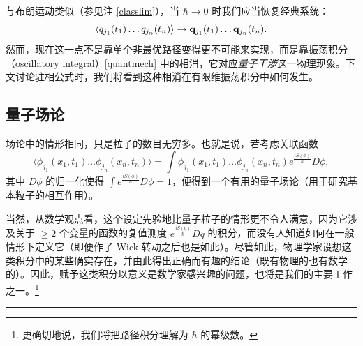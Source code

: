 \begin{remark} 与布朗运动类似（参见注 \ref{classlim}），当 $\hbar\to 0$ 时我们应当恢复经典系统：
$$
\langle q_{j_1}(t_1) \ldots q_{j_n}(t_n)\rangle\to \bold q_{j_1}(t_1) \ldots \bold q_{j_n}(t_n). 
$$
然而，现在这一点不是靠单个非最优路径变得更不可能来实现，而是靠振荡积分（oscillatory integral）\eqref{quantmech} 中的相消，它对应\emph{量子干涉}这一物理现象。下文讨论驻相公式时，我们将看到这种相消在有限维振荡积分中如何发生。
\end{remark}

\subsection{量子场论}

场论中的情形相同，只是粒子的数目无穷多。也就是说，若考虑关联函数
\begin{equation}\label{quanft}
\langle\phi_{j_1}(x_1,t_1) \ldots \phi_{j_n}(x_n,t_n)\rangle= 
\int \phi_{j_1}(x_1,t_1) \ldots \phi_{j_n}(x_n,t_n)e^{\frac{iS(\phi)}{\hbar}}D\phi, 
\end{equation}
其中 $D\phi$ 的归一化使得 $\int e^{\frac{iS(\phi)}{\hbar}}D\phi=1$，便得到一个有用的量子场论（用于研究基本粒子的相互作用）。

当然，从数学观点看，这个设定先验地比量子粒子的情形更不令人满意，因为它涉及关于 $\ge 2$ 个变量的函数的复值测度 $e^{\frac{iS(q)}{\hbar}}Dq$ 的积分，而没有人知道如何在一般情形下定义它（即便作了 Wick 转动之后也是如此）。尽管如此，物理学家设想这类积分中的某些确实存在，并由此得出正确而有趣的结论（既有物理的也有数学的）。因此，赋予这类积分以意义是数学家感兴趣的问题，也将是我们的主要工作之一。\footnote{更确切地说，我们将把路径积分理解为 $\hbar$ 的幂级数。}

\bigskip
\noindent\rule{\textwidth}{0.6pt}
